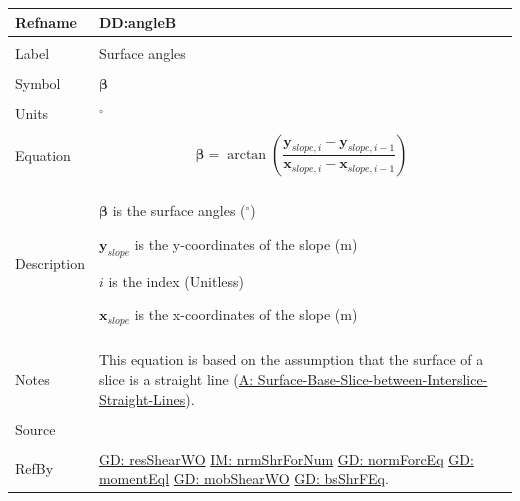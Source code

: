 \documentclass[12pt]{article}
\begin{document}
\noindent \begin{minipage}{\textwidth}
\begin{tabular}{p{} p{}}
\toprule \textbf{Refname} & \textbf{DD:angleB}
\label{DD:angleB}
\\ \midrule \\
Label & Surface angles
\\ \midrule \\
Symbol & $\mathbf{β}$
\\ \midrule \\
Units & ${}^{\circ}$
\\ \midrule \\
Equation & \begin{displaymath}
           \mathbf{β}=\arctan\left(\frac{{\mathbf{y}_{slope,i}}-{\mathbf{y}_{slope,i-1}}}{{\mathbf{x}_{slope,i}}-{\mathbf{x}_{slope,i-1}}}\right)
           \end{displaymath}
\\ \midrule \\
Description & \begin{symbDescription}
              \item{$\mathbf{β}$ is the surface angles (${}^{\circ}$)}
              \item{${\mathbf{y}_{slope}}$ is the y-coordinates of the slope (m)}
              \item{$i$ is the index (Unitless)}
              \item{${\mathbf{x}_{slope}}$ is the x-coordinates of the slope (m)}
              \end{symbDescription}
\\ \midrule \\
Notes & This equation is based on the assumption that the surface of a slice is a straight line (\hyperref[assumpSBSBISL]{A: Surface-Base-Slice-between-Interslice-Straight-Lines}).
\\ \midrule \\
Source & \cite{fredlund1977}
\\ \midrule \\
RefBy & \hyperref[GD:resShearWO]{GD: resShearWO} \hyperref[IM:nrmShrForNum]{IM: nrmShrForNum} \hyperref[GD:normForcEq]{GD: normForcEq} \hyperref[GD:momentEql]{GD: momentEql} \hyperref[GD:mobShearWO]{GD: mobShearWO} \hyperref[GD:bsShrFEq]{GD: bsShrFEq}.
\\ \bottomrule \end{tabular}
\end{minipage}
\par~
\end{document}
